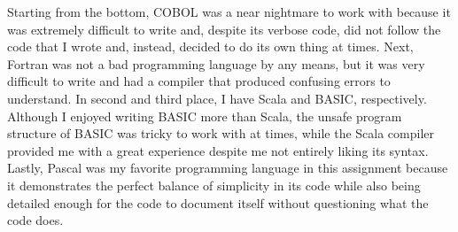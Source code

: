 \documentclass[letterpaper, 10pt, DIV=13]{scrartcl}
\numberwithin{equation}{section}
\numberwithin{figure}{section}
\numberwithin{table}{section}
\begin{document}
Starting from the bottom, COBOL was a near nightmare to work with because it was extremely difficult to write and, despite its verbose code, did not follow the code that I wrote and, instead, decided to do its own thing at times. Next, Fortran was not a bad programming language by any means, but it was very difficult to write and had a compiler that produced confusing errors to understand. In second and third place, I have Scala and BASIC, respectively. Although I enjoyed writing BASIC more than Scala, the unsafe program structure of BASIC was tricky to work with at times, while the Scala compiler provided me with a great experience despite me not entirely liking its syntax. Lastly, Pascal was my favorite programming language in this assignment because it demonstrates the perfect balance of simplicity in its code while also being detailed enough for the code to document itself without questioning what the code does.
\end{document}
